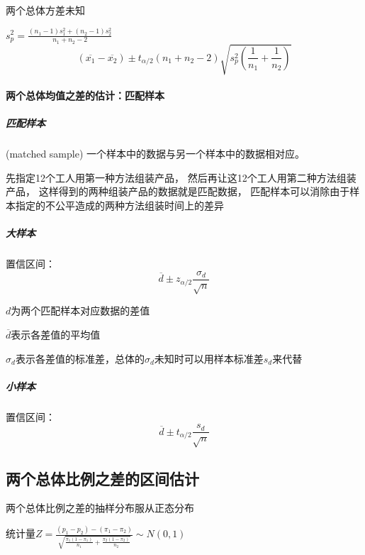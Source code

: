 \documentclass[UTF8,10pt]{book}
\begin{document}
                       
                        {\kaishu 两个总体方差未知}

                        $s_p^2 = \frac{ \left(n_1-1\right)s_1^2  +\left(n_2-1\right)s_2^2  }{n_1+n_2-2}$
                            $$\left( \overline{x_1}-\overline{x_2} \right)  \pm t_{\alpha/2} \left(n_1+n_2 - 2\right)  \sqrt{s_p^2 \left(     \frac{1}{n_1} + \frac{1}{n_2}    \right)}$$

                
                \paragraph{两个总体均值之差的估计：匹配样本}
                        
                        \subparagraph{匹配样本} (matched sample) 一个样本中的数据与另一个样本中的数据相对应。

                        {\kaishu 先指定12个工人用第一种方法组装产品，
                        然后再让这12个工人用第二种方法组装产品，
                        这样得到的两种组装产品的数据就是匹配数据，
                        匹配样本可以消除由于样本指定的不公平造成的两种方法组装时间上的差异}

                        \subparagraph{大样本}
                        {\kaishu 置信区间：}
                        $$ \overline{d} \pm z_{\alpha/2} \frac{\sigma_d}{\sqrt{n}} $$

                            {\kaishu $d$为两个匹配样本对应数据的差值
                            
                            $\overline{d}$表示各差值的平均值
                            
                            $\sigma_d$表示各差值的标准差，总体的$\sigma_d$未知时可以用样本标准差$s_d$来代替}

                        \subparagraph{小样本}
                        {\kaishu 置信区间：}
                        $$ \overline{d} \pm t_{\alpha/2} \frac{s_d}{\sqrt{n}} $$


            \subsection{两个总体比例之差的区间估计}

                        {\kaishu 两个总体比例之差的抽样分布服从正态分布
                        
                        统计量$  Z = \frac{(p_1 - p_2)- (\pi_1 - \pi_2)}{  \sqrt{  \frac{\pi_1(1-\pi_1)}{n_1} + \frac{\pi_2(1-\pi_2)}{n_2} }  }  \sim N(0,1)$}
\end{document}
